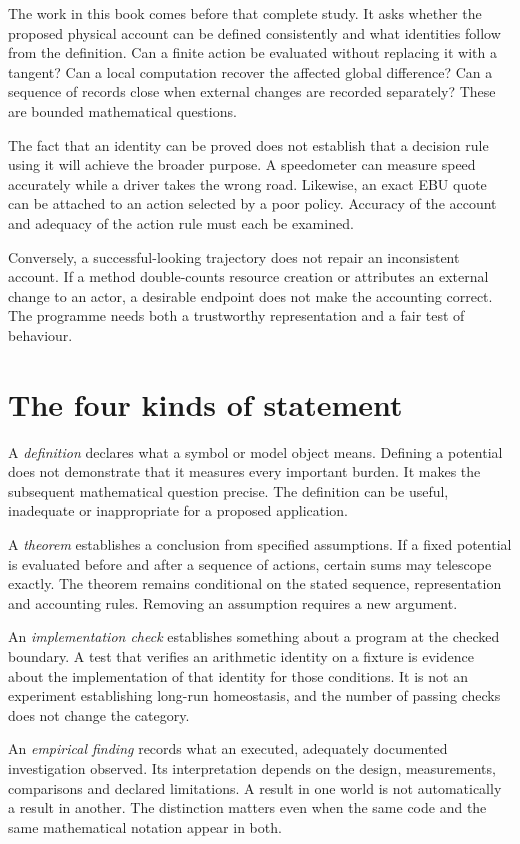 The work in this book comes before that complete study. It asks whether the proposed physical account can be defined consistently and what identities follow from the definition. Can a finite action be evaluated without replacing it with a tangent? Can a local computation recover the affected global difference? Can a sequence of records close when external changes are recorded separately? These are bounded mathematical questions.

The fact that an identity can be proved does not establish that a decision rule using it will achieve the broader purpose. A speedometer can measure speed accurately while a driver takes the wrong road. Likewise, an exact EBU quote can be attached to an action selected by a poor policy. Accuracy of the account and adequacy of the action rule must each be examined.

Conversely, a successful-looking trajectory does not repair an inconsistent account. If a method double-counts resource creation or attributes an external change to an actor, a desirable endpoint does not make the accounting correct. The programme needs both a trustworthy representation and a fair test of behaviour.

\section{The four kinds of statement}
A \emph{definition} declares what a symbol or model object means. Defining a potential does not demonstrate that it measures every important burden. It makes the subsequent mathematical question precise. The definition can be useful, inadequate or inappropriate for a proposed application.

A \emph{theorem} establishes a conclusion from specified assumptions. If a fixed potential is evaluated before and after a sequence of actions, certain sums may telescope exactly. The theorem remains conditional on the stated sequence, representation and accounting rules. Removing an assumption requires a new argument.

An \emph{implementation check} establishes something about a program at the checked boundary. A test that verifies an arithmetic identity on a fixture is evidence about the implementation of that identity for those conditions. It is not an experiment establishing long-run homeostasis, and the number of passing checks does not change the category.

An \emph{empirical finding} records what an executed, adequately documented investigation observed. Its interpretation depends on the design, measurements, comparisons and declared limitations. A result in one world is not automatically a result in another. The distinction matters even when the same code and the same mathematical notation appear in both.

